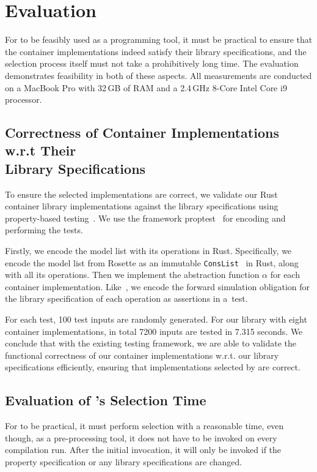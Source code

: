 \section{Evaluation}
\label{chap2:evaluation}

For \Primrose{} to be feasibly used as a programming tool, it must be practical to ensure that the container implementations indeed satisfy their library specifications, and the selection process itself must not take a prohibitively long time.
The evaluation demonstrates feasibility in both of these aspects. All measurements are conducted on a MacBook Pro with 32\,GB of RAM and a 2.4\,GHz 8-Core Intel Core i9 processor.

\subsection{Correctness of Container Implementations w.r.t Their\\Library Specifications}
\label{chap2:evaluation:testing}
To ensure the selected implementations are correct, we validate our Rust container library implementations against the library specifications using property-based testing~\citep{quickcheck}. 
We use the framework proptest~\citep{proptest}
for encoding and performing the tests.

Firstly, we encode the model list with its operations in Rust. Specifically, we encode the model list from Rosette as an immutable \lstinline|ConsList|~\citep{conslist}
in Rust, along with all its operations. Then we implement the abstraction function $\alpha$ for each container implementation. Like~\cite{cogentcase,sle}, we encode the forward simulation obligation for the library specification of each operation as assertions in a~test.

For each test, 100 test inputs are randomly generated. For our library with eight container implementations, in total 7200 inputs are tested in 7.315 seconds. We conclude that with the existing testing framework, we are able to validate the functional correctness of our container implementations w.r.t. our library specifications efficiently, ensuring that implementations selected by \Primrose{} are correct.

\subsection{Evaluation of \Primrose{}'s Selection Time}
\label{chap2:evaluation:efficiency}
For \Primrose{} to be practical, it must perform selection with a reasonable time, even though, as a pre-processing tool, it does not have to be invoked on every compilation run. After the initial invocation, it will only be invoked if the property specification or any library specifications are changed.

